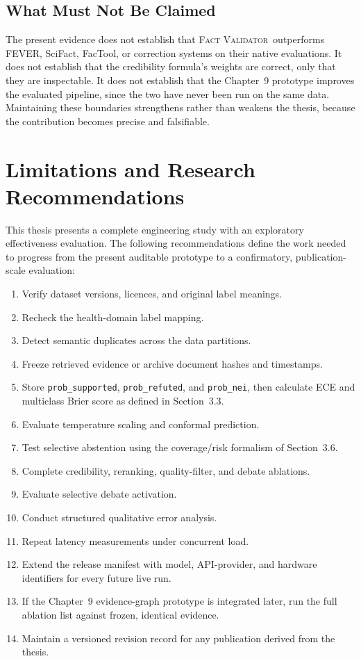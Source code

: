 \documentclass[12pt,a4paper,openany]{report}
\newcommand{\system}{\textsc{Fact Validator}}
\begin{document}
\section{What Must Not Be Claimed}
The present evidence does not establish that \system\ outperforms FEVER, SciFact, FacTool, or correction systems on their native evaluations. It does not establish that the credibility formula's weights are correct, only that they are inspectable. It does not establish that the Chapter~9 prototype improves the evaluated pipeline, since the two have never been run on the same data. Maintaining these boundaries strengthens rather than weakens the thesis, because the contribution becomes precise and falsifiable.

\chapter{Limitations and Research Recommendations}
This thesis presents a complete engineering study with an exploratory
effectiveness evaluation. The following recommendations define the work
needed to progress from the present auditable prototype to a confirmatory,
publication-scale evaluation:
\begin{enumerate}
  \item Verify dataset versions, licences, and original label meanings.
  \item Recheck the health-domain label mapping.
  \item Detect semantic duplicates across the data partitions.
  \item Freeze retrieved evidence or archive document hashes and timestamps.
  \item Store \texttt{prob\_supported}, \texttt{prob\_refuted}, and \texttt{prob\_nei}, then calculate ECE and multiclass Brier score as defined in Section~3.3.
  \item Evaluate temperature scaling and conformal prediction.
  \item Test selective abstention using the coverage/risk formalism of Section~3.6.
  \item Complete credibility, reranking, quality-filter, and debate ablations.
  \item Evaluate selective debate activation.
  \item Conduct structured qualitative error analysis.
  \item Repeat latency measurements under concurrent load.
  \item Extend the release manifest with model, API-provider, and hardware identifiers for every future live run.
  \item If the Chapter~9 evidence-graph prototype is integrated later, run the full ablation list against frozen, identical evidence.
  \item Maintain a versioned revision record for any publication derived from the thesis.
\end{enumerate}
\end{document}
